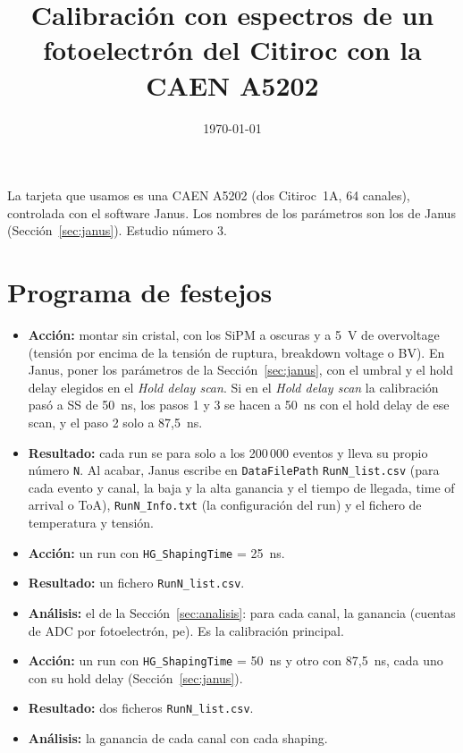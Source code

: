 \documentclass[11pt,a4paper]{article}
\title{Calibración con espectros de un fotoelectrón del Citiroc con la CAEN A5202}
\author{}
\date{\today}
\begin{document}
\maketitle

\noindent La tarjeta que usamos es una CAEN A5202 (dos Citiroc~1A, 64 canales),
controlada con el software Janus. Los nombres de los parámetros son los de
Janus (Sección~\ref{sec:janus}). Estudio número 3.

\section*{Programa de festejos}

\begin{itemize}
\item {\bf Acción:} montar sin cristal, con los SiPM a oscuras y a 5~V de overvoltage (tensión por encima de la
  tensión de ruptura, breakdown voltage o BV). En Janus, poner los
  parámetros de la Sección~\ref{sec:janus}, con el umbral y el hold delay
  elegidos en el \emph{Hold delay scan}. Si en el \emph{Hold delay scan} la
  calibración pasó a SS de 50~ns, los pasos 1 y 3 se hacen a 50~ns con el
  hold delay de ese scan, y el paso 2 solo a 87,5~ns.
\item {\bf Resultado:} cada run se para solo a los 200\,000 eventos y lleva
  su propio número \texttt{N}. Al acabar, Janus escribe en
  \texttt{DataFilePath} \texttt{RunN\_list.csv} (para cada evento y canal,
  la baja y la alta ganancia y el tiempo de llegada, time of arrival o ToA),
  \texttt{RunN\_Info.txt} (la configuración del run) y el fichero de
  temperatura y tensión.
\end{itemize}

\begin{itemize}
\item {\bf Acción:} un run con \texttt{HG\_ShapingTime} = 25~ns.
\item {\bf Resultado:} un fichero \texttt{RunN\_list.csv}.
\item {\bf Análisis:} el de la Sección~\ref{sec:analisis}: para cada canal,
  la ganancia (cuentas de ADC por fotoelectrón, pe). Es la calibración
  principal.
\end{itemize}

\begin{itemize}
\item {\bf Acción:} un run con \texttt{HG\_ShapingTime} = 50~ns y otro con
  87,5~ns, cada uno con su hold delay (Sección~\ref{sec:janus}).
\item {\bf Resultado:} dos ficheros \texttt{RunN\_list.csv}.
\item {\bf Análisis:} la ganancia de cada canal con cada shaping.
\end{itemize}
\end{document}
